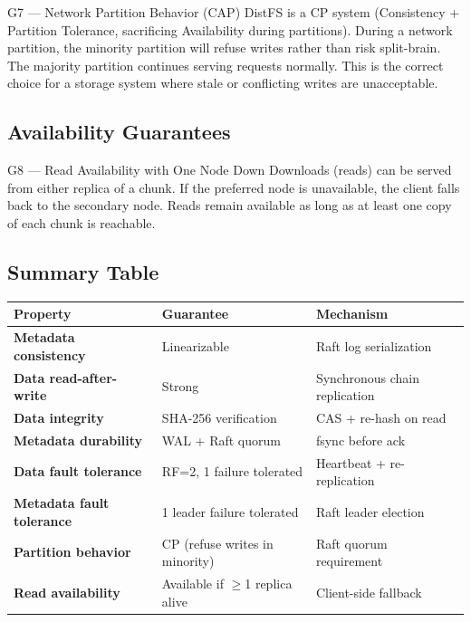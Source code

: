 \documentclass[12pt,a4paper]{article}
\begin{document}
\begin{guaranteebox}{G7 — Network Partition Behavior (CAP)}
DistFS is a CP system (Consistency + Partition Tolerance, sacrificing Availability during partitions). During a network partition, the minority partition will refuse writes rather than risk split-brain. The majority partition continues serving requests normally. This is the correct choice for a storage system where stale or conflicting writes are unacceptable.
\end{guaranteebox}

\subsection{Availability Guarantees}

\begin{guaranteebox}{G8 — Read Availability with One Node Down}
Downloads (reads) can be served from either replica of a chunk. If the preferred node is unavailable, the client falls back to the secondary node. Reads remain available as long as at least one copy of each chunk is reachable.
\end{guaranteebox}

\subsection{Summary Table}

\begin{center}
\begin{tabular}{>{\bfseries}p{4.5cm} p{4cm} p{5cm}}
\toprule
Property & Guarantee & Mechanism \\
\midrule
Metadata consistency & Linearizable & Raft log serialization \\
Data read-after-write & Strong & Synchronous chain replication \\
Data integrity & SHA-256 verification & CAS + re-hash on read \\
Metadata durability & WAL + Raft quorum & fsync before ack \\
Data fault tolerance & RF=2, 1 failure tolerated & Heartbeat + re-replication \\
Metadata fault tolerance & 1 leader failure tolerated & Raft leader election \\
Partition behavior & CP (refuse writes in minority) & Raft quorum requirement \\
Read availability & Available if $\geq$1 replica alive & Client-side fallback \\
\bottomrule
\end{tabular}
\end{center}
\end{document}
